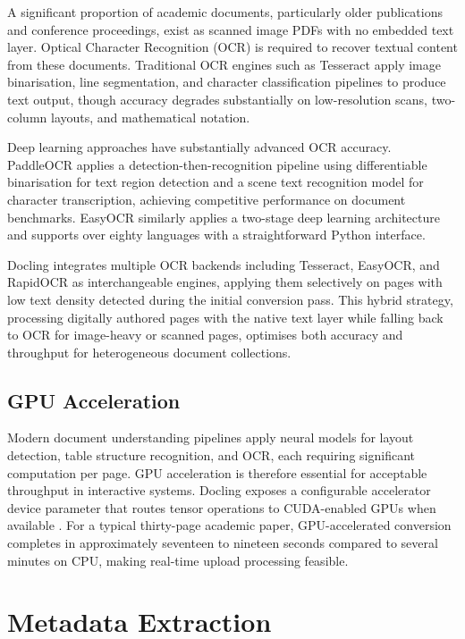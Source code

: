 \documentclass[12pt,a4paper]{report}
\begin{document}
A significant proportion of academic documents, particularly 
older publications and conference proceedings, exist as scanned 
image PDFs with no embedded text layer. Optical Character 
Recognition (OCR) is required to recover textual content from 
these documents. Traditional OCR engines such as Tesseract 
\cite{smith2007} apply image binarisation, line segmentation, 
and character classification pipelines to produce text output, 
though accuracy degrades substantially on low-resolution scans, 
two-column layouts, and mathematical notation.

Deep learning approaches have substantially advanced OCR 
accuracy. PaddleOCR \cite{du2020} applies a detection-then-recognition 
pipeline using differentiable binarisation for text region 
detection and a scene text recognition model for character 
transcription, achieving competitive performance on document 
benchmarks. EasyOCR \cite{easyocr2021} similarly applies a 
two-stage deep learning architecture and supports over eighty 
languages with a straightforward Python interface.

Docling integrates multiple OCR backends including Tesseract, 
EasyOCR, and RapidOCR as interchangeable engines, applying them 
selectively on pages with low text density detected during the 
initial conversion pass. This hybrid strategy, processing 
digitally authored pages with the native text layer while 
falling back to OCR for image-heavy or scanned pages, optimises 
both accuracy and throughput for heterogeneous document 
collections.

\subsection{GPU Acceleration}

Modern document understanding pipelines apply neural models for 
layout detection, table structure recognition, and OCR, each 
requiring significant computation per page. GPU acceleration 
is therefore essential for acceptable throughput in interactive 
systems. Docling exposes a configurable accelerator device 
parameter that routes tensor operations to CUDA-enabled GPUs 
when available \cite{docling2024}. For a typical thirty-page 
academic paper, GPU-accelerated conversion completes in 
approximately seventeen to nineteen seconds compared to 
several minutes on CPU, making real-time upload processing 
feasible.

\section{Metadata Extraction}
\end{document}
